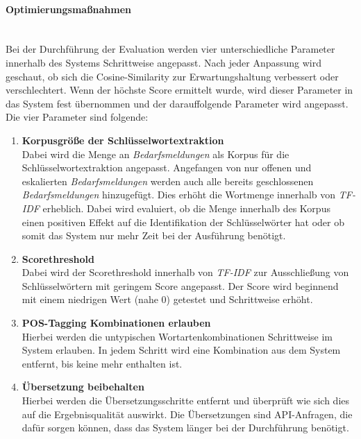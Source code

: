 \paragraph{Optimierungsmaßnahmen}\label{sec:optimierungsmaßnahmen}\mbox{}\\
Bei der Durchführung der Evaluation werden vier unterschiedliche Parameter innerhalb des Systems Schrittweise angepasst. Nach jeder Anpassung wird geschaut, ob sich die Cosine-Similarity zur Erwartungshaltung verbessert oder verschlechtert. Wenn der höchste Score ermittelt wurde, wird dieser Parameter in das System fest übernommen und der darauffolgende Parameter wird angepasst. Die vier Parameter sind folgende:
\begin{enumerate}
	\item \textbf{Korpusgröße der Schlüsselwortextraktion} \\ Dabei wird die Menge an \emph{Bedarfsmeldungen} als Korpus für die Schlüsselwortextraktion angepasst. Angefangen von nur offenen und eskalierten \emph{Bedarfsmeldungen} werden auch alle bereits geschlossenen \emph{Bedarfsmeldungen} hinzugefügt. Dies erhöht die Wortmenge innerhalb von \emph{TF-IDF} erheblich. Dabei wird evaluiert, ob die Menge innerhalb des Korpus einen positiven Effekt auf die Identifikation der Schlüsselwörter hat oder ob somit das System nur mehr Zeit bei der Ausführung benötigt.
	\item \textbf{Scorethreshold} \\ Dabei wird der Scorethreshold innerhalb von \emph{TF-IDF} zur Ausschließung von Schlüsselwörtern mit geringem Score angepasst. Der Score wird beginnend mit einem niedrigen Wert (nahe 0) getestet und Schrittweise erhöht.
	\item \textbf{POS-Tagging Kombinationen erlauben} \\ Hierbei werden die untypischen Wortartenkombinationen Schrittweise im System erlauben. In jedem Schritt wird eine Kombination aus dem System entfernt, bis keine mehr enthalten ist.
	\item \textbf{Übersetzung beibehalten} \\ Hierbei werden die Übersetzungsschritte entfernt und überprüft wie sich dies auf die Ergebnisqualität auswirkt. Die Übersetzungen sind API-Anfragen, die dafür sorgen können, dass das System länger bei der Durchführung benötigt.
\end{enumerate}
